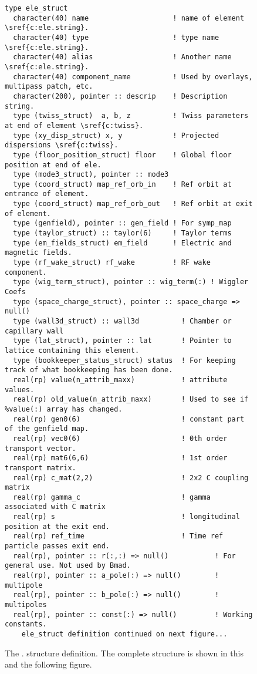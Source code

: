 \begin{figure}[tb]
\centering
\footnotesize
\begin{verbatim}
type ele_struct
  character(40) name                    ! name of element \sref{c:ele.string}.
  character(40) type                    ! type name \sref{c:ele.string}.
  character(40) alias                   ! Another name \sref{c:ele.string}.
  character(40) component_name          ! Used by overlays, multipass patch, etc.
  character(200), pointer :: descrip    ! Description string.
  type (twiss_struct)  a, b, z          ! Twiss parameters at end of element \sref{c:twiss}.
  type (xy_disp_struct) x, y            ! Projected dispersions \sref{c:twiss}.
  type (floor_position_struct) floor    ! Global floor position at end of ele.
  type (mode3_struct), pointer :: mode3 
  type (coord_struct) map_ref_orb_in    ! Ref orbit at entrance of element.
  type (coord_struct) map_ref_orb_out   ! Ref orbit at exit of element.
  type (genfield), pointer :: gen_field ! For symp_map
  type (taylor_struct) :: taylor(6)     ! Taylor terms
  type (em_fields_struct) em_field      ! Electric and magnetic fields.
  type (rf_wake_struct) rf_wake         ! RF wake component.
  type (wig_term_struct), pointer :: wig_term(:) ! Wiggler Coefs
  type (space_charge_struct), pointer :: space_charge => null()
  type (wall3d_struct) :: wall3d          ! Chamber or capillary wall
  type (lat_struct), pointer :: lat       ! Pointer to lattice containing this element.
  type (bookkeeper_status_struct) status  ! For keeping track of what bookkeeping has been done.
  real(rp) value(n_attrib_maxx)           ! attribute values.
  real(rp) old_value(n_attrib_maxx)       ! Used to see if %value(:) array has changed.
  real(rp) gen0(6)                        ! constant part of the genfield map.
  real(rp) vec0(6)                        ! 0th order transport vector.
  real(rp) mat6(6,6)                      ! 1st order transport matrix.
  real(rp) c_mat(2,2)                     ! 2x2 C coupling matrix
  real(rp) gamma_c                        ! gamma associated with C matrix
  real(rp) s                              ! longitudinal position at the exit end.
  real(rp) ref_time                       ! Time ref particle passes exit end.
  real(rp), pointer :: r(:,:) => null()           ! For general use. Not used by Bmad.
  real(rp), pointer :: a_pole(:) => null()        ! multipole
  real(rp), pointer :: b_pole(:) => null()        ! multipoles
  real(rp), pointer :: const(:) => null()         ! Working constants.
    ele_struct definition continued on next figure...
\end{verbatim}
\caption[The  (part 1).]{The . structure definition. 
The complete structure is shown in this and the following figure.}
\label{f:ele.struct1}
\end{figure}

